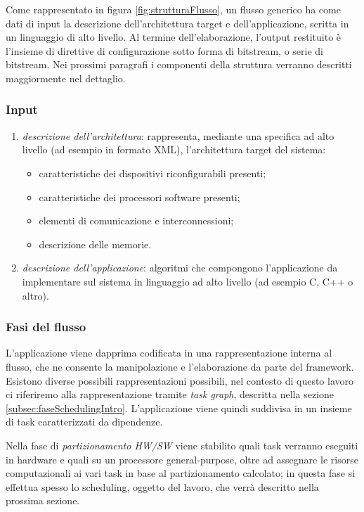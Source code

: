 Come rappresentato in figura \ref{fig:strutturaFlusso}, un flusso generico ha come dati di input la descrizione
dell'architettura target e dell'applicazione, scritta in un linguaggio di alto livello.
Al termine dell'elaborazione, l'output restituito \`e l'insieme di direttive di configurazione sotto forma
di bitstream, o serie di bitstream. Nei prossimi paragrafi i componenti della struttura verranno descritti
maggiormente nel dettaglio.

\subsubsection{Input}
\begin{enumerate}
  \item \emph{descrizione dell'architettura}: rappresenta, mediante una specifica ad alto livello (ad esempio
    in formato XML), l'architettura target del sistema:
    \begin{itemize}
      \item caratteristiche dei dispositivi riconfigurabili presenti;
      \item caratteristiche dei processori software presenti;
      \item elementi di comunicazione e interconnessioni;
      \item descrizione delle memorie.
    \end{itemize}
  \item \emph{descrizione dell'applicazione}: algoritmi che compongono l'applicazione da implementare sul sistema
    in linguaggio ad alto livello (ad esempio C, C++ o altro).
\end{enumerate}

\subsubsection{Fasi del flusso}
L'applicazione viene dapprima codificata in una rappresentazione interna al flusso, che ne consente la manipolazione
e l'elaborazione da parte del framework. Esistono diverse possibili rappresentazioni possibili, nel contesto di
questo lavoro ci riferiremo alla rappresentazione tramite \emph{task graph}, descritta nella sezione
\ref{subsec:faseSchedulingIntro}. L'applicazione viene quindi suddivisa in un insieme di task caratterizzati
da dipendenze. 

Nella fase di \emph{partizionamento HW/SW} viene stabilito quali task verranno eseguiti in hardware
e quali su un processore general-purpose, oltre ad assegnare le risorse computazionali ai vari task in base al
partizionamento calcolato; in questa fase si effettua spesso lo scheduling, oggetto del lavoro, che verr\`a descritto
nella prossima sezione.

